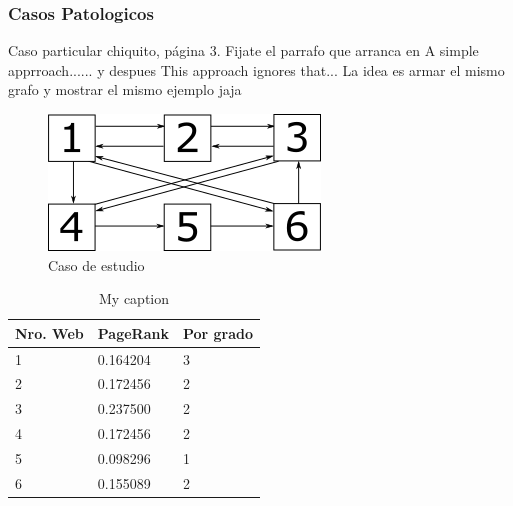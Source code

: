 \subsubsection{Casos Patologicos}
Caso particular chiquito, página 3. Fijate el parrafo que arranca en A simple apprroach...... y despues This approach ignores that... La idea es armar el mismo grafo y mostrar el mismo ejemplo jaja

\begin{figure}[H]
\centering
\includegraphics[scale=1.0]{images/grafo.png}
\caption{Caso de estudio}
\label{casoEst}
\end{figure}

\begin{table}[H]
\centering
\caption{My caption}
\label{my-label}
\begin{tabular}{lll}
\hline
Nro. Web & PageRank & Por grado \\ \hline
1        & 0.164204 & 3         \\
2        & 0.172456 & 2         \\
3        & 0.237500 & 2         \\
4        & 0.172456 & 2         \\
5        & 0.098296 & 1         \\
6        & 0.155089 & 2         \\ \hline
\end{tabular}
\end{table}